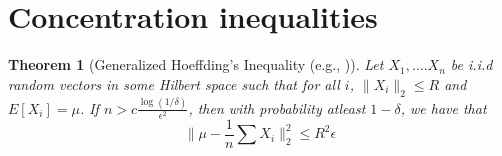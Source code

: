 \documentclass{article}
\newcommand{\mc}{\mathcal}
\newtheorem{theorem}{Theorem}
\begin{document}
\section{Concentration inequalities}
\label{appendixsection:conIneq}

\begin{theorem}[Generalized Hoeffding's Inequality (e.g., \cite{ashtiani2015dimension})]
\label{thm:genHoeff}
Let $X_1, \ldots. X_n$ be i.i.d random vectors in some Hilbert space such that for all $i$, $\|X_i\|_2 \le R$ and $E[X_i] = \mu$. If $n > c\frac{\log(1/\delta)}{\epsilon^2}$, then with probability atleast $1-\delta$, we have that
$$\Big\|\mu - \frac{1}{n}\sum X_i\Big\|_2^2 \le R^2\epsilon$$ 
\end{theorem}







\end{document}
